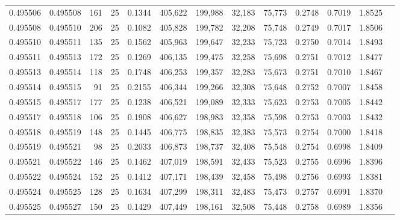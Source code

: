 \begin{tabular}{rrrrrrrrrrrrr}
0.495506 & 0.495508 &   161 &  25 &                                     0.1344 & 405,622 & 199,988 &  32,183 &  75,773 & 0.2748 & 0.7019 & 1.8525 \\
0.495508 & 0.495510 &   206 &  25 &                                     0.1082 & 405,828 & 199,782 &  32,208 &  75,748 & 0.2749 & 0.7017 & 1.8506 \\
0.495510 & 0.495511 &   135 &  25 &                                     0.1562 & 405,963 & 199,647 &  32,233 &  75,723 & 0.2750 & 0.7014 & 1.8493 \\
0.495511 & 0.495513 &   172 &  25 &                                     0.1269 & 406,135 & 199,475 &  32,258 &  75,698 & 0.2751 & 0.7012 & 1.8477 \\
0.495513 & 0.495514 &   118 &  25 &                                     0.1748 & 406,253 & 199,357 &  32,283 &  75,673 & 0.2751 & 0.7010 & 1.8467 \\
0.495514 & 0.495515 &    91 &  25 &                                     0.2155 & 406,344 & 199,266 &  32,308 &  75,648 & 0.2752 & 0.7007 & 1.8458 \\
0.495515 & 0.495517 &   177 &  25 &                                     0.1238 & 406,521 & 199,089 &  32,333 &  75,623 & 0.2753 & 0.7005 & 1.8442 \\
0.495517 & 0.495518 &   106 &  25 &                                     0.1908 & 406,627 & 198,983 &  32,358 &  75,598 & 0.2753 & 0.7003 & 1.8432 \\
0.495518 & 0.495519 &   148 &  25 &                                     0.1445 & 406,775 & 198,835 &  32,383 &  75,573 & 0.2754 & 0.7000 & 1.8418 \\
0.495519 & 0.495521 &    98 &  25 &                                     0.2033 & 406,873 & 198,737 &  32,408 &  75,548 & 0.2754 & 0.6998 & 1.8409 \\
0.495521 & 0.495522 &   146 &  25 &                                     0.1462 & 407,019 & 198,591 &  32,433 &  75,523 & 0.2755 & 0.6996 & 1.8396 \\
0.495522 & 0.495524 &   152 &  25 &                                     0.1412 & 407,171 & 198,439 &  32,458 &  75,498 & 0.2756 & 0.6993 & 1.8381 \\
0.495524 & 0.495525 &   128 &  25 &                                     0.1634 & 407,299 & 198,311 &  32,483 &  75,473 & 0.2757 & 0.6991 & 1.8370 \\
0.495525 & 0.495527 &   150 &  25 &                                     0.1429 & 407,449 & 198,161 &  32,508 &  75,448 & 0.2758 & 0.6989 & 1.8356 \\

\end{tabular}
